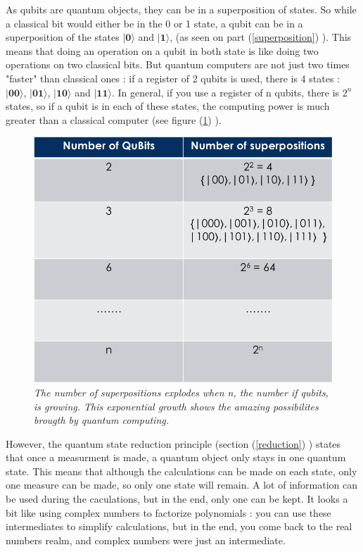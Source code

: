 \documentclass[a4paper,12pt]{report}
\newcommand{\quSt}[1]{\bm{|#1\rangle}}
\newcommand{\para}[1]{\par{#1}\\}
\begin{document}
\para{
    As qubits are quantum objects, they can be in a superposition of states. So while a classical bit would either be in the 0 or 1 state, a qubit can be in a superposition of the states $\quSt{0}$ and $\quSt{1}$, (as seen on part (\ref{superposition}) ). This means that doing an operation on a qubit in both state is like doing two operations on two classical bits. But quantum computers are not just two times "faster" than classical ones : if a register of 2 qubits is used, there is 4 states : $\quSt{00}$, $\quSt{01}$, $\quSt{10}$ and $\quSt{11}$. In general, if you use a register of n qubits, there is $2^n$ states, so if a qubit is in each of these states, the computing power is much greater than a classical computer (see figure (\ref{exponential-power}) ).
}

\begin{figure}
	\begin{center}
		\includegraphics[scale=0.6]{images/exponential-power}
	\end{center}
	\caption{\textit{The number of superpositions explodes when n, the number if qubits, is growing. This exponential growth shows the amazing possibilites brougth by quantum computing.}}
	\label{exponential-power}
\end{figure}

\para{
    However, the quantum state reduction principle (section (\ref{reduction}) ) states that once a measurment is made, a quantum object only stays in one quantum state. This means that although the calculations can be made on each state, only one measure can be made, so only one state will remain. A lot of information can be used during the caculations, but in the end, only one can be kept. It looks a bit like using complex numbers to factorize polynomials : you can use these intermediates to simplify calculations, but in the end, you come back to the real numbers realm, and complex numbers were just an intermediate.
}
\end{document}
